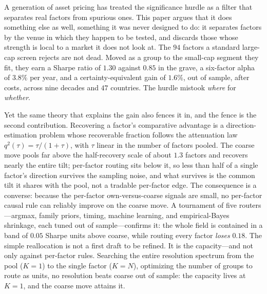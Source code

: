 \documentclass[12pt]{article}
\theoremstyle{plain}
\theoremstyle{definition}
\begin{document}
A generation of asset pricing has treated the significance hurdle as a filter
that separates real factors from spurious ones. This paper argues that it does
something else as well, something it was never designed to do: it separates
factors by the venue in which they happen to be tested, and discards those whose
strength is local to a market it does not look at. The $94$ factors a standard
large-cap screen rejects are not dead. Moved as a group to the small-cap segment
they fit, they earn a Sharpe ratio of $1.30$ against $0.85$ in the grave, a
six-factor alpha of $3.8\%$ per year, and a certainty-equivalent gain of $1.6\%$,
out of sample, after costs, across nine decades and $47$ countries. The hurdle
mistook \emph{where} for \emph{whether}.

Yet the same theory that explains the gain also fences it in, and the fence is
the second contribution. Recovering a factor's comparative advantage is a
direction-estimation problem whose recoverable fraction follows the attenuation
law $q^2(\tau)=\tau/(1+\tau)$, with $\tau$ linear in the number of factors
pooled. The coarse move pools far above the half-recovery scale of about $1.3$
factors and recovers nearly the entire tilt; per-factor routing sits below it, so
less than half of a single factor's direction survives the sampling noise, and
what survives is the common tilt it shares with the pool, not a tradable
per-factor edge. The consequence is a converse: because the per-factor
own-versus-coarse signals are small, no per-factor causal rule can reliably
improve on the coarse move. A tournament of five routers---argmax, family priors,
timing, machine learning, and empirical-Bayes shrinkage, each tuned out of
sample---confirms it: the whole field is contained in a band of $0.05$ Sharpe
units above coarse, while routing every factor \emph{loses} $0.18$. The simple
reallocation is not a first draft to be refined. It is the capacity---and not
only against per-factor rules. Searching the entire resolution spectrum from the
pool ($K=1$) to the single factor ($K=N$), optimizing the number of groups to
route as units, no resolution beats coarse out of sample: the capacity lives at
$K=1$, and the coarse move attains it.
\end{document}
